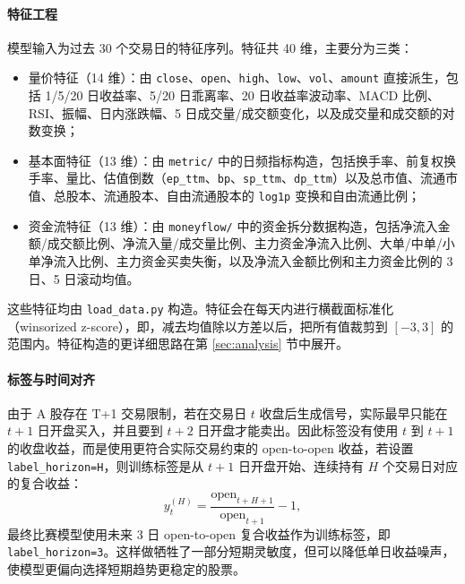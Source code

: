 \documentclass[fontset=mac]{ctexart}
\begin{document}
\paragraph{特征工程}
模型输入为过去 30 个交易日的特征序列。特征共 40 维，主要分为三类：
\begin{itemize}[noitemsep]
    \item 量价特征（14 维）：由 \verb|close|、\verb|open|、\verb|high|、\verb|low|、\verb|vol|、\verb|amount| 直接派生，包括 1/5/20 日收益率、5/20 日乖离率、20 日收益率波动率、MACD 比例、RSI、振幅、日内涨跌幅、5 日成交量/成交额变化，以及成交量和成交额的对数变换；
    \item 基本面特征（13 维）：由 \verb|metric/| 中的日频指标构造，包括换手率、前复权换手率、量比、估值倒数（\verb|ep_ttm|、\verb|bp|、\verb|sp_ttm|、\verb|dp_ttm|）以及总市值、流通市值、总股本、流通股本、自由流通股本的 \verb|log1p| 变换和自由流通比例；
    \item 资金流特征（13 维）：由 \verb|moneyflow/| 中的资金拆分数据构造，包括净流入金额/成交额比例、净流入量/成交量比例、主力资金净流入比例、大单/中单/小单净流入比例、主力资金买卖失衡，以及净流入金额比例和主力资金比例的 3 日、5 日滚动均值。
\end{itemize}

这些特征均由 \verb|load_data.py| 构造。特征会在每天内进行横截面标准化（winsorized z-score），即，减去均值除以方差以后，把所有值裁剪到 $[-3, 3]$ 的范围内。特征构造的更详细思路在第 \ref{sec:analysis} 节中展开。


\paragraph{标签与时间对齐}
由于 A 股存在 T+1 交易限制，若在交易日 $t$ 收盘后生成信号，实际最早只能在 $t+1$ 日开盘买入，并且要到 $t+2$ 日开盘才能卖出。因此标签没有使用 $t$ 到 $t+1$ 的收盘收益，而是使用更符合实际交易约束的 open-to-open 收益，若设置 \verb|label_horizon=H|，则训练标签是从 $t+1$ 日开盘开始、连续持有 $H$ 个交易日对应的复合收益：
\[
    y_t^{(H)} =  \frac{\mathrm{open}_{t+H+1}}{\mathrm{open}_{t+1}} - 1,
\]
最终比赛模型使用未来 3 日 open-to-open 复合收益作为训练标签，即 \verb|label_horizon=3|。这样做牺牲了一部分短期灵敏度，但可以降低单日收益噪声，使模型更偏向选择短期趋势更稳定的股票。
\end{document}
